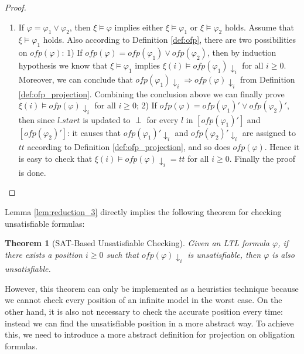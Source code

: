 \documentclass[conference]{IEEEtran}
\newtheorem{theorem}{Theorem}
\newtheorem{proof}{IEEEproof}
\def\phi{\varphi}
\def\tt{\mathit{tt}}
\def\ofp#1{\mathit{ofp}(#1)}
\def\nondeter{\perp}
\begin{document}
\begin{proof}
\begin{enumerate}
    
    \item If $\phi=\phi_1\vee\phi_2$, then $\xi\models\phi$ implies either $\xi\models\phi_1$ or 
    $\xi\models\phi_2$ holds. Assume that $\xi\models\phi_1$ holds. 
    Also according to Definition \ref{def:ofp}, there are two possibilities 
    on $\ofp{\phi}$: 1) If $\ofp{\phi}= \ofp{\phi_1}\vee \ofp{\phi_2}$, then by induction hypothesis 
    we know that $\xi\models\phi_1$ implies $\xi(i)\models \ofp{\phi_1}\!\downarrow_i$ for all 
    $i\geq 0$. Moreover, we can conclude that 
    $\ofp{\phi_1}\!\downarrow_i\Rightarrow \ofp{\phi}\!\downarrow_i$ from Definition 
    \ref{def:ofp_projection}. Combining the conclusion above we can 
    finally prove $\xi(i)\models \ofp{\phi}\!\downarrow_i$ for all 
    $i\geq 0$; 2) If $\ofp{\phi}= \ofp{\phi_1}'\vee \ofp{\phi_2}'$, then since $l.start$ is updated to 
    $
\nondeter$ for every $l$ in 
    $[\ofp{\phi_1}']$ and $[\ofp{\phi_2}']$: it causes that $\ofp{\phi_1}'\!\downarrow_i$ and 
    $\ofp{\phi_2}'\!\downarrow_i$ are assigned to $\tt$ according to Definition 
    \ref{def:ofp_projection}, and so does $\ofp{\phi}$. Hence it is 
    easy to check that $\xi(i)\models \ofp{\phi}\!\downarrow_i=\tt$ for all 
    $i\geq 0$. Finally the proof is done.
  \end{enumerate}
  
\end{proof}

Lemma \ref{lem:reduction_3} directly implies the following theorem for checking unsatisfiable 
formulas:  

\begin{theorem}[SAT-Based Unsatisfiable Checking]\label{thm:satunsat}
    Given an LTL formula $\phi$, if there exists a position $i\ge 0$ such that 
    $\ofp{\phi}\downarrow_i$ 
    is unsatisfiable, then $\phi$ is also unsatisfiable. 
\end{theorem}

\iffalse
\begin{proof}
  One can check easily that, this theorem is immediately proven by applying the reverse law on 
  Lemma \ref{lem:reduction_3}.
\end{proof}
\fi

However, this theorem can only be implemented as a heuristics technique because we cannot check 
every position of an infinite model in the worst case. On the other hand, it is also not necessary 
to check the 
accurate position every time: instead we can find the unsatisfiable position in a more 
abstract way. 
To achieve this, we need to introduce a more abstract definition for projection on obligation formulas.
\end{document}

